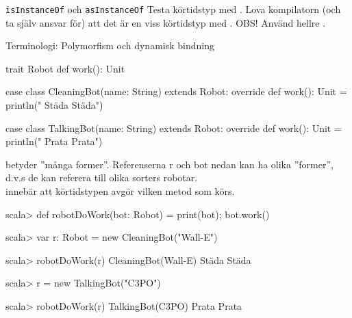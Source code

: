 \begin{Slide}{\texttt{isInstanceOf} och \texttt{asInstanceOf}}\SlideFontTiny
Testa körtidstyp med . Lova kompilatorn (och ta själv ansvar för) att det är en viss körtidstyp med . OBS! Använd hellre .
\end{Slide}



  

\begin{Slide}{Terminologi: Polymorfism och dynamisk bindning}\SlideFontTiny
\begin{Code}[basicstyle=\SlideFontSize{6.2}{7.5}\ttfamily\selectfont]
trait Robot { def work(): Unit }

case class CleaningBot(name: String) extends Robot:
  override def work(): Unit = println(" Städa Städa")

case class TalkingBot(name: String) extends Robot:
  override def work(): Unit = println(" Prata Prata")
\end{Code}
 betyder ''många former''. Referenserna r och bot nedan kan ha olika ''former'', d.v.s de kan referera till olika sorters robotar. \\  innebär att körtidstypen avgör vilken metod som körs.
\begin{REPL}[numbers=left, basicstyle=\color{white}\SlideFontSize{6.2}{7.5}\ttfamily\selectfont]
scala> def robotDoWork(bot: Robot) = { print(bot); bot.work() }

scala> var r: Robot = new CleaningBot("Wall-E")

scala> robotDoWork(r)
CleaningBot(Wall-E) Städa Städa

scala> r = new TalkingBot("C3PO")

scala> robotDoWork(r)
TalkingBot(C3PO) Prata Prata
\end{REPL}
\end{Slide}


